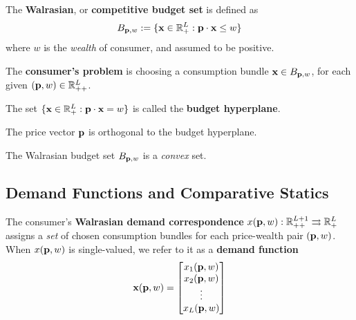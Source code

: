 \documentclass{article}
\begin{document}
 			\begin{definition}[2.D.1]
 				The \textbf{Walrasian}, or \textbf{competitive budget set} is defined as
 				\begin{equation}
 					B_{\textbf{p}, w} := \{
 						\textbf{x} \in \mathbb{R}^L_+: \textbf{p} \cdot \textbf{x} \leq w
 					\}
 				\end{equation}
 				where $w$ is the \emph{wealth} of consumer, and assumed to be positive.
 			\end{definition}
 			
 			\begin{definition}
 				The \textbf{consumer's problem} is choosing a consumption bundle $\textbf{x} \in B_{\textbf{p}, w}$, for each given $(\textbf{p}, w) \in \mathbb{R}^L_{++}$.
 			\end{definition}
 			
 			\begin{definition}
 				The set $\{\textbf{x} \in \mathbb{R}^L_+: \textbf{p} \cdot \textbf{x} = w\}$ is called the \textbf{budget hyperplane}.
 			\end{definition}
 			
 			\begin{proposition}
 				The price vector $\textbf{p}$ is orthogonal to the budget hyperplane.
 			\end{proposition}
 			
 			\begin{proposition}
 				The Walrasian budget set $B_{\textbf{p}, w}$ is a \emph{convex} set.
 			\end{proposition}
 		
 		\subsection{Demand Functions and Comparative Statics}
 			\begin{definition}
 				The consumer's \textbf{Walrasian demand correspondence} $x(\textbf{p}, w): \mathbb{R}_{++}^{L+1} \rightrightarrows \mathbb{R}_+^L$ assigns a \emph{set} of chosen consumption bundles for each price-wealth pair $(\textbf{p}, w)$. When $x(\textbf{p}, w)$ is single-valued, we refer to it as a \textbf{demand function}
 				\begin{equation}
 					\textbf{x}(\textbf{p}, w) = 
 					\begin{bmatrix}
 						x_1(\textbf{p}, w) \\
 						x_2(\textbf{p}, w) \\
 						\vdots \\
 						x_L(\textbf{p}, w)
 					\end{bmatrix}
 				\end{equation}
 			\end{definition}
 			
\end{document}

